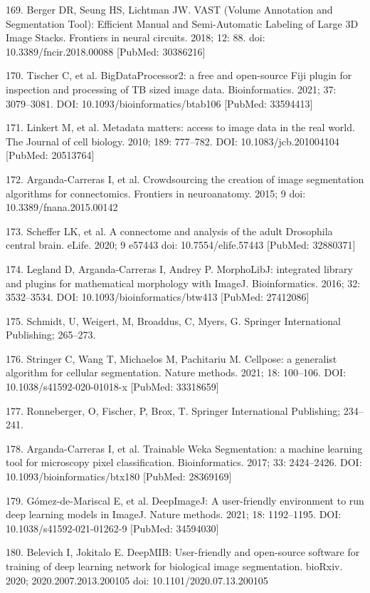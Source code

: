 \documentclass{article}
\begin{document}
\begin{hangpars}
169. Berger DR, Seung HS, Lichtman JW. VAST (Volume Annotation and Segmentation Tool): Efficient Manual and Semi-Automatic Labeling of Large 3D Image Stacks. Frontiers in neural circuits. 2018; 12: 88. doi: 10.3389/fncir.2018.00088 [PubMed: 30386216]

170. Tischer C, et al. BigDataProcessor2: a free and open-source Fiji plugin for inspection and processing of TB sized image data. Bioinformatics. 2021; 37: 3079–3081. DOI: 10.1093/bioinformatics/btab106 [PubMed: 33594413]

171. Linkert M, et al. Metadata matters: access to image data in the real world. The Journal of cell biology. 2010; 189: 777–782. DOI: 10.1083/jcb.201004104 [PubMed: 20513764]

172. Arganda-Carreras I, et al. Crowdsourcing the creation of image segmentation algorithms for connectomics. Frontiers in neuroanatomy. 2015; 9 doi: 10.3389/fnana.2015.00142

173. Scheffer LK, et al. A connectome and analysis of the adult Drosophila central brain. eLife. 2020; 9 e57443 doi: 10.7554/elife.57443 [PubMed: 32880371]

174. Legland D, Arganda-Carreras I, Andrey P. MorphoLibJ: integrated library and plugins for mathematical morphology with ImageJ. Bioinformatics. 2016; 32: 3532–3534. DOI: 10.1093/bioinformatics/btw413 [PubMed: 27412086]

175. Schmidt, U, Weigert, M, Broaddus, C, Myers, G. Springer International Publishing; 265–273.

176. Stringer C, Wang T, Michaelos M, Pachitariu M. Cellpose: a generalist algorithm for cellular segmentation. Nature methods. 2021; 18: 100–106. DOI: 10.1038/s41592-020-01018-x [PubMed: 33318659]

177. Ronneberger, O, Fischer, P, Brox, T. Springer International Publishing; 234–241.

178. Arganda-Carreras I, et al. Trainable Weka Segmentation: a machine learning tool for microscopy pixel classification. Bioinformatics. 2017; 33: 2424–2426. DOI: 10.1093/bioinformatics/btx180 [PubMed: 28369169]

179. Gómez-de-Mariscal E, et al. DeepImageJ: A user-friendly environment to run deep learning models in ImageJ. Nature methods. 2021; 18: 1192–1195. DOI: 10.1038/s41592-021-01262-9 [PubMed: 34594030]

180. Belevich I, Jokitalo E. DeepMIB: User-friendly and open-source software for training of deep learning network for biological image segmentation. bioRxiv. 2020; 2020.2007.2013.200105 doi: 10.1101/2020.07.13.200105


\end{hangpars}
\end{document}
